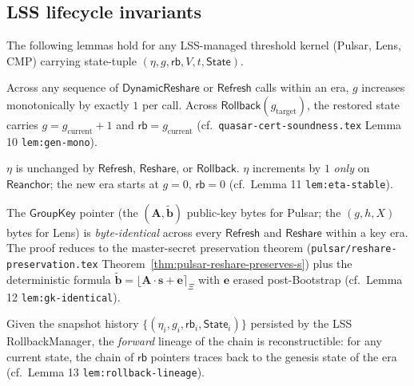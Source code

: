 
\subsection*{LSS lifecycle invariants}

The following lemmas hold for any LSS-managed threshold kernel
(Pulsar, Lens, CMP) carrying state-tuple
$(\eta, g, \mathsf{rb}, V, t, \mathsf{State})$.

\begin{lemma}
\label{lem:gen-monotonic}
Across any sequence of $\mathsf{DynamicReshare}$ or $\mathsf{Refresh}$
calls within an era, $g$ increases monotonically by exactly $1$ per
call. Across $\mathsf{Rollback}(g_{\text{target}})$, the restored state
carries $g = g_{\text{current}} + 1$ and
$\mathsf{rb} = g_{\text{current}}$ (cf.\
\texttt{quasar-cert-soundness.tex} Lemma 10
\texttt{lem:gen-mono}).
\end{lemma}

\begin{lemma}
\label{lem:eta-stable}
$\eta$ is unchanged by $\mathsf{Refresh}$, $\mathsf{Reshare}$, or
$\mathsf{Rollback}$. $\eta$ increments by $1$ \emph{only} on
$\mathsf{Reanchor}$; the new era starts at $g = 0$, $\mathsf{rb} = 0$
(cf.\ Lemma 11 \texttt{lem:eta-stable}).
\end{lemma}

\begin{lemma}
\label{lem:gk-byte-identical}
The $\mathsf{GroupKey}$ pointer (the $(\mathbf{A}, \tilde{\mathbf{b}})$
public-key bytes for Pulsar; the $(g, h, X)$ bytes for Lens) is
\emph{byte-identical} across every $\mathsf{Refresh}$ and
$\mathsf{Reshare}$ within a key era. The proof reduces to the
master-secret preservation theorem
(\texttt{pulsar/reshare-preservation.tex}
Theorem~\ref{thm:pulsar-reshare-preserves-s}) plus the deterministic
formula $\tilde{\mathbf{b}} = \lfloor\mathbf{A}\cdot\mathbf{s} +
\mathbf{e}\rceil_\Xi$ with $\mathbf{e}$ erased post-Bootstrap (cf.\
Lemma 12 \texttt{lem:gk-identical}).
\end{lemma}

\begin{lemma}
\label{lem:rollback-lineage}
Given the snapshot history $\{(\eta_i, g_i, \mathsf{rb}_i,
\mathsf{State}_i)\}$ persisted by the LSS RollbackManager, the
\emph{forward} lineage of the chain is reconstructible: for any
current state, the chain of $\mathsf{rb}$ pointers traces back to the
genesis state of the era (cf.\ Lemma 13
\texttt{lem:rollback-lineage}).
\end{lemma}
